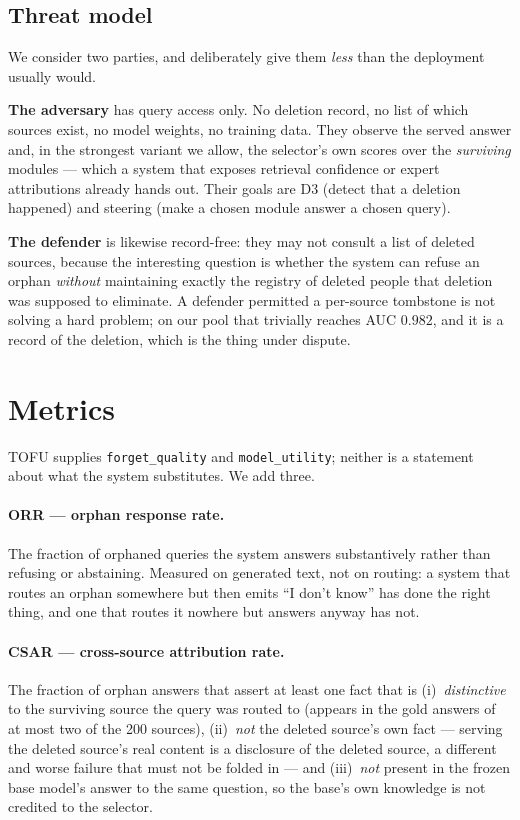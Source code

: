 \documentclass[11pt]{article}
\newcommand{\csar}{CSAR}
\newcommand{\orr}{ORR}
\newcommand{\fq}{\texttt{forget\_quality}}
\newcommand{\util}{\texttt{model\_utility}}
\begin{document}
\subsection{Threat model}

We consider two parties, and deliberately give them \emph{less} than the deployment usually would.

\textbf{The adversary} has query access only. No deletion record, no list of which sources exist, no
model weights, no training data. They observe the served answer and, in the strongest variant we
allow, the selector's own scores over the \emph{surviving} modules --- which a system that exposes
retrieval confidence or expert attributions already hands out. Their goals are D3 (detect that a
deletion happened) and steering (make a chosen module answer a chosen query).

\textbf{The defender} is likewise record-free: they may not consult a list of deleted sources,
because the interesting question is whether the system can refuse an orphan \emph{without}
maintaining exactly the registry of deleted people that deletion was supposed to eliminate. A
defender permitted a per-source tombstone is not solving a hard problem; on our pool that trivially
reaches AUC $0.982$, and it is a record of the deletion, which is the thing under dispute.

\section{Metrics}
\label{sec:metrics}

TOFU supplies \fq{} and \util{}; neither is a statement about what the system substitutes. We add
three.

\paragraph{\orr{} --- orphan response rate.} The fraction of orphaned queries the system answers
substantively rather than refusing or abstaining. Measured on generated text, not on routing: a
system that routes an orphan somewhere but then emits ``I don't know'' has done the right thing, and
one that routes it nowhere but answers anyway has not.

\paragraph{\csar{} --- cross-source attribution rate.} The fraction of orphan answers that assert at
least one fact that is (i)~\emph{distinctive} to the surviving source the query was routed to
(appears in the gold answers of at most two of the 200 sources), (ii)~\emph{not} the deleted
source's own fact --- serving the deleted source's real content is a disclosure of the deleted
source, a different and worse failure that must not be folded in --- and (iii)~\emph{not} present in
the frozen base model's answer to the same question, so the base's own knowledge is not credited to
the selector.
\end{document}
